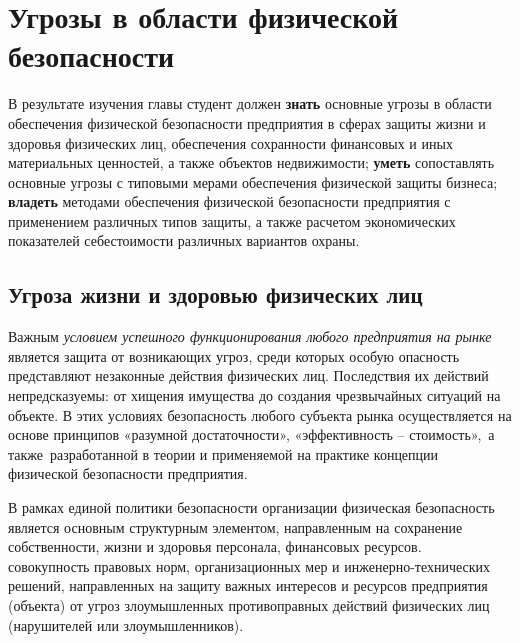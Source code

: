 \documentclass[a4paper,12pt,fleqn]{article} %
\author{}
\title{}
\date{}
\begin{document}
	
\tableofcontents

\newpage


\section{Угрозы в области физической безопасности}

\begin{tcolorbox}[colback=blue!40!red!10!,colframe=blue!40!red]

В результате изучения главы студент должен \textbf{знать} основные угрозы в области обеспечения физической безопасности предприятия в сферах защиты жизни и здоровья физических лиц, обеспечения сохранности финансовых и иных материальных ценностей, а также объектов недвижимости; \textbf{уметь} сопоставлять основные угрозы с типовыми мерами обеспечения физической защиты бизнеса; \textbf{владеть} методами обеспечения физической безопасности предприятия с применением различных типов защиты, а также расчетом экономических показателей себестоимости различных вариантов охраны.

\end{tcolorbox}


\subsection{Угроза жизни и здоровью физических лиц}

Важным \textit{условием успешного функционирования любого предприятия на рынке} является защита от возникающих угроз, среди которых особую опасность представляют незаконные действия физических лиц. Последствия их действий непредсказуемы: от хищения имущества до создания чрезвычайных ситуаций на объекте. В этих условиях безопасность любого субъекта рынка осуществляется на основе принципов «разумной достаточности», «эффективность – стоимость», а также разработанной в теории и применяемой на практике концепции физической безопасности предприятия.

В рамках единой политики безопасности организации физическая безопасность является основным структурным элементом, направленным на сохранение собственности, жизни и здоровья персонала, финансовых ресурсов.\\

 {совокупность правовых норм, организационных мер и инженерно-технических решений, направленных на защиту важных интересов и ресурсов предприятия (объекта) от угроз злоумышленных противоправных действий физических лиц (нарушителей или злоумышленников).}
\end{document}
